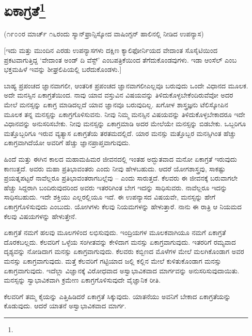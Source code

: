 
\chapter[ಏಕಾಗ್ರತೆ]{ಏಕಾಗ್ರತೆ\protect\footnote{}}

\begin{center}
(೧೯೦೦ರ ಮಾರ್ಚ್ ೧೬ರಂದು ಸ್ಯಾನ್‌ಫ್ರಾನ್ಸಿಸ್ಕೋದ ವಾಷಿಂಗ್ಟನ್ ಹಾಲಿನಲ್ಲಿ ನೀಡಿದ ಉಪನ್ಯಾಸ)
\end{center}

[ಇದು ಮತ್ತು ಮುಂದಿನ ಎರಡು ಉಪನ್ಯಾಸಗಳು ದಕ್ಷಿಣ ಕ್ಯಾಲಿಫೋರ್ನಿಯದ ವೇದಾಂತ ಸೊಸೈಟಿಯಿಂದ ಪ್ರಕಟವಾಗುತ್ತಿದ್ದ `ವೇದಾಂತ ಅಂಡ್ ದಿ ವೆಸ್ಟ್' ಎಂಬ\break ಪತ್ರಿಕೆಯಿಂದ ತೆಗೆದುಕೊಂಡವುಗಳು. ಇಡಾ ಆಂಸೆಲ್ ಎಂಬ ಭಕ್ತಮಹಿಳೆ ಇವನ್ನು ಶೀಘ್ರಲಿಪಿಯಲ್ಲಿ ಬರೆದುಕೊಂಡಳು.]

ಬಾಹ್ಯ ಪ್ರಪಂಚದ ಜ್ಞಾನವಾಗಲೀ, ಆಂತರಿಕ ಪ್ರಪಂಚದ ಜ್ಞಾನವಾಗಲೀ\break ಎಲ್ಲವೂ ಬರುವುದು ಒಂದೇ ವಿಧಾನದ ಮೂಲಕ. ಅದೇ ಮನಸ್ಸಿನ ಏಕಾಗ್ರತೆಯಿಂದ. ನಾವು ಯಾವ ವಸ್ತುವಿನ ವಿಷಯವನ್ನು ತಿಳಿದುಕೊಳ್ಳಬೇಕೆಂದಿರುವೆವೋ ಅದರ ಮೇಲೆ ಮನಸ್ಸನ್ನು ಏಕಾಗ್ರ ಮಾಡಿದಲ್ಲದೆ ಯಾವ ಜ್ಞಾನವೂ ಬರುವುದಿಲ್ಲ. ಖಗೋಳ ಶಾಸ್ತ್ರಜ್ಞನು ಟೆಲಿಸ್ಕೋಪಿನ ಮೂಲಕ ತನ್ನ ಮನಸ್ಸನ್ನು ಏಕಾಗ್ರಗೊಳಿಸುವನು. ನೀವು ನಿಮ್ಮ ಮನಸ್ಸಿನ ವಿಷಯವನ್ನು ತಿಳಿದುಕೊಳ್ಳಬೇಕಾದರೂ ಇದೇ ವಿಧಾನವನ್ನು ಅನುಸರಿಸಬೇಕು. ನೀವು ಮನಸ್ಸನ್ನು ಏಕಾಗ್ರಮಾಡಿ ಅದರ ಮೇಲೆಯೇ ಮನಸ್ಸನ್ನು ಬಿಡಬೇಕು. ಒಬ್ಬರಿಗೂ ಮತ್ತೊಬ್ಬರಿಗೂ ಇರುವ ವ್ಯತ್ಯಾಸ ಏಕಾಗ್ರತೆಯ ತರತಮದಲ್ಲಿದೆ. ಯಾರ ಮನಸ್ಸು ಮತ್ತೊಬ್ಬರ ಮನಸ್ಸಿಗಿಂತ ಹೆಚ್ಚು ಏಕಾಗ್ರವಾಗಿದೆಯೋ ಅವರಿಗೆ ಹೆಚ್ಚು ಜ್ಞಾನ\break ಪ್ರಾಪ್ತವಾಗುವುದು.

ಹಿಂದೆ ಮತ್ತು ಈಗಿನ ಕಾಲದ ಮಹಾಮಹಿಮರ ಜೀವನದಲ್ಲಿ ಇಂತಹ ಅದ್ಭುತವಾದ ಮನೋ ಏಕಾಗ್ರತೆ ಇರುವುದು ಕಾಣುತ್ತದೆ. ಅವರು ಮಹಾ ಪ್ರತಿಭಾವಂತರು ಎಂದು ನೀವು ಹೇಳಬಹುದು. ಆದರೆ ಯೋಗಶಾಸ್ತ್ರವು, ಸಾಕಷ್ಟು ಪ್ರಯತ್ನಪಟ್ಟರೆ ನಾವೆಲ್ಲರೂ ಪ್ರತಿಭಾವಂತರಾಗಬಲ್ಲೆವು – ಎಂದು ಸಾರುತ್ತದೆ. ಕೆಲವರು ಈ ಜೀವನಕ್ಕೆ ಬರುವಾಗಲೇ ಹೆಚ್ಚು ಸಿದ್ದರಾಗಿ ಬಂದಿರುವುದರಿಂದ ಅವರು ಇತರರಿಗಿಂತ ಬೇಗ ಇದನ್ನು ಸಾಧಿಸುವರು. ನಾವೆಲ್ಲರೂ ಇದನ್ನು ಸಾಧಿಸಬಹುದು. ಇದೇ ಶಕ್ತಿಯು ಎಲ್ಲರಲ್ಲಿಯೂ ಇದೆ. ಈ ಉಪನ್ಯಾಸದ ವಿಷಯವೇ, ಮನಸ್ಸನ್ನು ಹೇಗೆ ಏಕಾಗ್ರಗೊಳಿಸುವುದು ಎಂಬುದು. ಯೋಗಿಗಳು ಕೆಲವು ನಿಯಮಗಳನ್ನು ಹೇಳುತ್ತಾರೆ. ನಾನು ಈ ರಾತ್ರಿ ಆ ನಿಯಮದ ಕೆಲವು ವಿಷಯಗಳನ್ನು ಹೇಳುತ್ತೇನೆ.

ಏಕಾಗ್ರತೆ ನಮಗೆ ಹಲವು ಮೂಲಗಳಿಂದ ಲಭಿಸುವುದು. ಇಂದ್ರಿಯಗಳ ಮೂಲಕವಾಗಿಯೂ ನಮಗೆ ಏಕಾಗ್ರತೆ ದೊರಕಬಲ್ಲದು. ಕೆಲವರಿಗೆ ಒಳ್ಳೆಯ ಸಂಗೀತವನ್ನು ಕೇಳಿದಾಗ ಮನಸ್ಸು ಏಕಾಗ್ರವಾಗುವುದು. ಇತರರಿಗೆ ರಮ್ಯವಾದ ದೃಶ್ಯವನ್ನು ನೋಡಿದಾಗ ಮನಸ್ಸು ಏಕಾಗ್ರವಾಗುವುದು. ಕೆಲವರು ಕಬ್ಬಿಣದ ಮೊಳೆಗಳ ಮೇಲೆ ಮಲಗಿಕೊಂಡಾಗ ಅವರ ಮನಸ್ಸು ಏಕಾಗ್ರವಾಗುವುದು. ಮತ್ತೆ ಕೆಲವರಿಗೆ ಗಟ್ಟಿಯಾದ ಜಲ್ಲಿ ಕಲ್ಲಿನ ಮೇಲೆ ಕುಳಿತುಕೊಂಡಾಗ ಮನಸ್ಸು ಏಕಾಗ್ರವಾಗುವುದು. ಇದೆಲ್ಲಾ ವಿಜ್ಞಾನಕ್ಕೆ ವಿರೋಧವಾದ ಅಸ್ವಾಭಾವಿಕವಾದ ಮಾರ್ಗವನ್ನು ಅನುಸರಿಸುವುದಾಯಿತು. ಮನಸ್ಸನ್ನು ಸ್ವಾಭಾವಿಕವಾಗಿ ಕ್ರಮೇಣ ಏಕಾಗ್ರಗೊಳಿಸುವುದೇ ವೈಜ್ಞಾನಿಕ ರೀತಿ.

ಕೆಲವರಿಗೆ ತಮ್ಮ ಕೈಯನ್ನು ಎತ್ತಿಹಿಡಿದರೆ ಏಕಾಗ್ರತೆ ಸಿಕ್ಕುವುದು. ಯಾತನೆಯು ಅವನಿಗೆ ಬೇಕಾದ ಏಕಾಗ್ರತೆಯನ್ನು ಕೊಡುವುದು. ಆದರೆ ಯಾತನೆ ಅಸ್ವಾಭಾವಿಕವಾದ ಮಾರ್ಗ.

